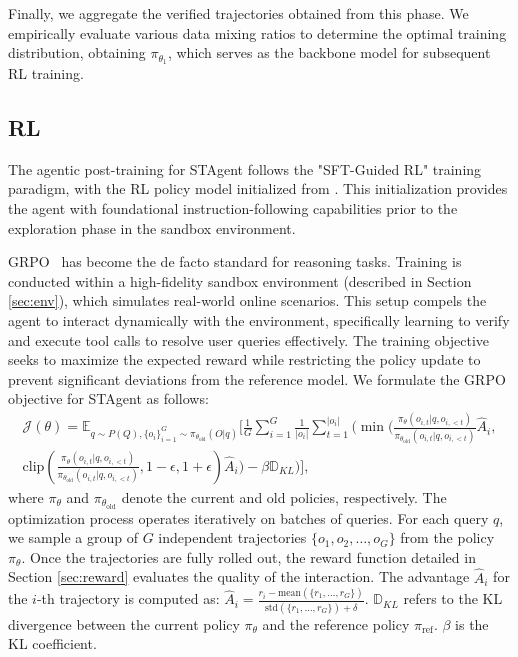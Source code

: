 \documentclass{article} %
\newcommand{\model}{STAgent\xspace}
\begin{document}
Finally, we aggregate the verified trajectories obtained from this phase. We empirically evaluate various data mixing ratios to determine the optimal training distribution, obtaining $\pi_{\theta_{1}}$, which serves as the backbone model for subsequent RL training.







\subsection{RL} \label{sec:rl}
The agentic post-training for \model follows the "SFT-Guided RL" training paradigm, with the RL policy model initialized from . This initialization provides the agent with foundational instruction-following capabilities prior to the exploration phase in the sandbox environment.





GRPO~\citep{shao2024deepseekmath} has become the de facto standard for reasoning tasks. Training is conducted within a high-fidelity sandbox environment (described in Section \ref{sec:env}), which simulates real-world online scenarios. This setup compels the agent to interact dynamically with the environment, specifically learning to verify and execute tool calls to resolve user queries effectively. The training objective seeks to maximize the expected reward while restricting the policy update to prevent significant deviations from the reference model. We formulate the GRPO objective for \model as follows:
\begin{equation}
\begin{split}
\mathcal{J}(\theta) = \mathbb{E}_{q \sim P(Q), \{o_i\}_{i=1}^G \sim \pi_{\theta_{\text{old}}}(O|q)} \Bigg[ \frac{1}{G} \sum_{i=1}^G \frac{1}{|o_i|} \sum_{t=1}^{|o_i|} \Bigg( \min \Bigg( \frac{\pi_\theta(o_{i,t} | q, o_{i,<t})}{\pi_{\theta_{\text{old}}}(o_{i,t} | q, o_{i,<t})} \hat{A}_i, \\
\text{clip} \left( \frac{\pi_\theta(o_{i,t} | q, o_{i,<t})}{\pi_{\theta_{\text{old}}}(o_{i,t} | q, o_{i,<t})}, 1-\epsilon, 1+\epsilon \right) \hat{A}_i \Bigg) - \beta \mathbb{D}_{KL} \Bigg) \Bigg],
\end{split}
\end{equation}
where $\pi_{\theta}$ and $\pi_{\theta_{\text{old}}}$ denote the current and old policies, respectively. 
The optimization process operates iteratively on batches of queries. For each query $q$, we sample a group of $G$ independent trajectories $\{o_1, o_2, \dots, o_G\}$ from the  policy $\pi_\theta$. Once the trajectories are fully rolled out, the reward function detailed in Section \ref{sec:reward} evaluates the quality of the interaction. The advantage $\hat{A}_i$ for the $i$-th trajectory is computed as:
$
\hat{A}_i = \frac{r_i - \text{mean}(\{r_1, \dots, r_G\})}{\text{std}(\{r_1, \dots, r_G\}) + \delta}.
$ $\mathbb{D}_{KL}$ refers to the KL divergence between the current policy $\pi_\theta$ and the reference policy $\pi_{\text{ref}}$. $\beta$ is the KL coefficient.
\end{document}
